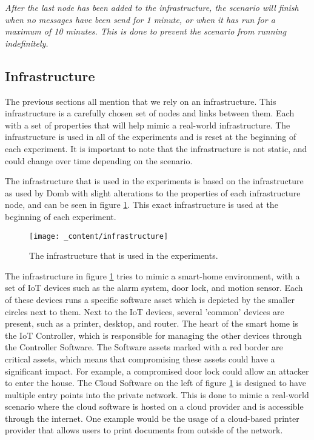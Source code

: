 \textit{After the last node has been added to the infrastructure, the scenario will finish when no messages have been send for 1 minute, or when it has run for a maximum of 10 minutes. This is done to prevent the scenario from running indefinitely.}


\subsection{Infrastructure}
\label{ssec:infrastructure}
The previous sections all mention that we rely on an infrastructure. This infrastructure is a carefully chosen set of nodes and links between them. Each with a set of properties that will help mimic a real-world infrastructure. The infrastructure is used in all of the experiments and is reset at the beginning of each experiment. It is important to note that the infrastructure is not static, and could change over time depending on the scenario.

The infrastructure that is used in the experiments is based on the infrastructure as used by Domb \cite{domb2019smart} with slight alterations to the properties of each infrastructure node, and can be seen in figure \ref{fig:infrastructure}. This exact infrastructure is used at the beginning of each experiment.

\begin{figure}[H]
    \centering
    \texttt{[image: \_content/infrastructure]}
    \caption{The infrastructure that is used in the experiments.}
    \label{fig:infrastructure}
\end{figure}

The infrastructure in figure \ref{fig:infrastructure} tries to mimic a smart-home environment, with a set of IoT devices such as the alarm system, door lock, and motion sensor. Each of these devices runs a specific software asset which is depicted by the smaller circles next to them. Next to the IoT devices, several 'common' devices are present, such as a printer, desktop, and router. The heart of the smart home is the IoT Controller, which is responsible for managing the other devices through the Controller Software. The Software assets marked with a red border are critical assets, which means that compromising these assets could have a significant impact. For example, a compromised door lock could allow an attacker to enter the house. The Cloud Software on the left of figure \ref{fig:infrastructure} is designed to have multiple entry points into the private network. This is done to mimic a real-world scenario where the cloud software is hosted on a cloud provider and is accessible through the internet. One example would be the usage of a cloud-based printer provider that allows users to print documents from outside of the network.


